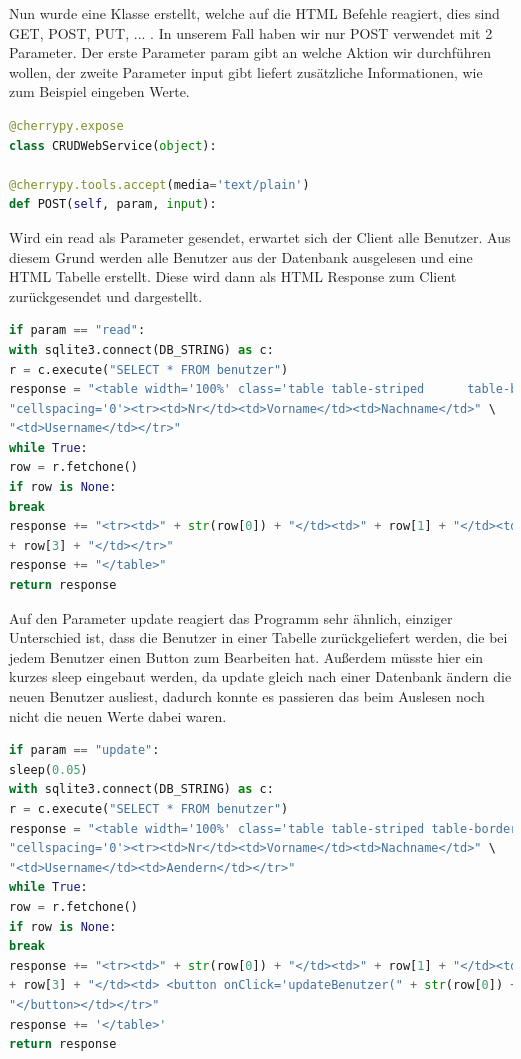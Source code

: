 Nun wurde eine Klasse erstellt, welche auf die HTML Befehle reagiert, dies sind GET, POST, PUT, ... . In unserem Fall haben wir nur POST verwendet mit 2 Parameter. Der erste Parameter param gibt an welche Aktion wir durchführen wollen, der zweite Parameter input gibt liefert zusätzliche Informationen, wie zum Beispiel eingeben Werte.

\begin{lstlisting}[language=Python, caption=Klasse zur verwaltung der HTML Befehle]
@cherrypy.expose
class CRUDWebService(object):

@cherrypy.tools.accept(media='text/plain')
def POST(self, param, input):
\end{lstlisting}
\clearpage
Wird ein read als Parameter gesendet, erwartet sich der Client alle Benutzer. Aus diesem Grund werden alle Benutzer aus der Datenbank ausgelesen und eine HTML Tabelle erstellt. Diese wird dann als HTML Response zum Client zurückgesendet und dargestellt.

\begin{lstlisting}[language=Python, caption=Auslesen aller Benutzer aus der Datenbank]
if param == "read":
with sqlite3.connect(DB_STRING) as c:
r = c.execute("SELECT * FROM benutzer")
response = "<table width='100%' class='table table-striped 		table-bordered'" \
"cellspacing='0'><tr><td>Nr</td><td>Vorname</td><td>Nachname</td>" \
"<td>Username</td></tr>"
while True:
row = r.fetchone()
if row is None:
break
response += "<tr><td>" + str(row[0]) + "</td><td>" + row[1] + "</td><td>" + row[2] + "</td><td>" \
+ row[3] + "</td></tr>"
response += "</table>"
return response
\end{lstlisting}

Auf den Parameter update reagiert das Programm sehr ähnlich, einziger Unterschied ist, dass die Benutzer in einer Tabelle zurückgeliefert werden, die bei jedem Benutzer einen Button zum Bearbeiten hat. Außerdem müsste hier ein kurzes sleep eingebaut werden, da update gleich nach einer Datenbank ändern die neuen Benutzer ausliest, dadurch konnte es passieren das beim Auslesen noch nicht die neuen Werte dabei waren.

\begin{lstlisting}[language=Python, caption=Auslesen aller Benutzer aus der Datenbank und bearbeitbar zurückliefern]
if param == "update":
sleep(0.05)
with sqlite3.connect(DB_STRING) as c:
r = c.execute("SELECT * FROM benutzer")
response = "<table width='100%' class='table table-striped table-bordered'" \
"cellspacing='0'><tr><td>Nr</td><td>Vorname</td><td>Nachname</td>" \
"<td>Username</td><td>Aendern</td></tr>"
while True:
row = r.fetchone()
if row is None:
break
response += "<tr><td>" + str(row[0]) + "</td><td>" + row[1] + "</td><td>" + row[2] + "</td><td>" \
+ row[3] + "</td><td> <button onClick='updateBenutzer(" + str(row[0]) + ")'>Aendern" \
"</button></td></tr>"
response += '</table>'
return response
\end{lstlisting}


